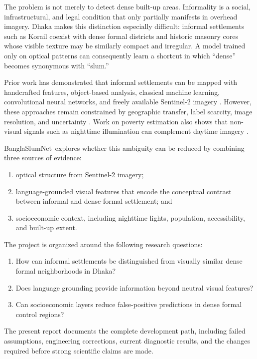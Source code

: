 \documentclass[11pt,a4paper]{article}
\newcommand{\project}{BanglaSlumNet}
\begin{document}
The problem is not merely to detect dense built-up areas. Informality is a social, infrastructural, and legal condition that only partially manifests in overhead imagery. Dhaka makes this distinction especially difficult: informal settlements such as Korail coexist with dense formal districts and historic masonry cores whose visible texture may be similarly compact and irregular. A model trained only on optical patterns can consequently learn a shortcut in which ``dense'' becomes synonymous with ``slum.''

Prior work has demonstrated that informal settlements can be mapped with handcrafted features, object-based analysis, classical machine learning, convolutional neural networks, and freely available Sentinel-2 imagery \citep{kuffer2016slums,mboga2017detection,gramhansen2019mapping,matarira2022gee}. However, these approaches remain constrained by geographic transfer, label scarcity, image resolution, and uncertainty \citep{fisher2022uncertainty}. Work on poverty estimation also shows that non-visual signals such as nighttime illumination can complement daytime imagery \citep{jean2016poverty}.

\project\ explores whether this ambiguity can be reduced by combining three sources of evidence:

\begin{enumerate}
    \item optical structure from Sentinel-2 imagery;
    \item language-grounded visual features that encode the conceptual contrast between informal and dense-formal settlement; and
    \item socioeconomic context, including nighttime lights, population, accessibility, and built-up extent.
\end{enumerate}

The project is organized around the following research questions:

\begin{enumerate}
    \item How can informal settlements be distinguished from visually similar dense formal neighborhoods in Dhaka?
    \item Does language grounding provide information beyond neutral visual features?
    \item Can socioeconomic layers reduce false-positive predictions in dense formal control regions?
\end{enumerate}

The present report documents the complete development path, including failed assumptions, engineering corrections, current diagnostic results, and the changes required before strong scientific claims are made.
\end{document}
